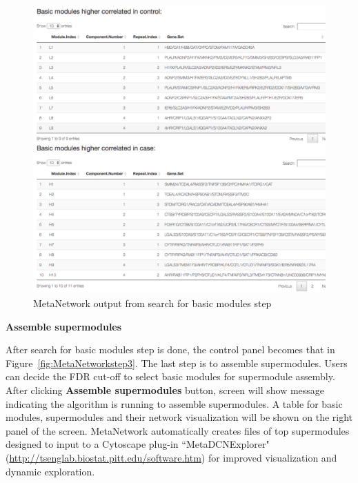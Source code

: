 \begin{steps}
\begin{figure}[H]
\begin{center}
\includegraphics[scale=0.9]{./figure/MetaNetwork/MetaNetworkBM}
\caption{MetaNetwork output from search for basic modules step}
\label{fig:MetaNetworkBM}
\end{center}
\end{figure}

\item \textbf{Assemble supermodules}

After search for basic modules step is done, the control panel becomes that in Figure~\ref{fig:MetaNetworkstep3}. The last step is to assemble supermodules. Users can decide the FDR cut-off to select basic modules for supermodule assembly. 
After clicking \textbf{Assemble supermodules} button, screen will show message indicating the algorithm is running to assemble supermodules.
A table for basic modules, supermodules and their network visualization will be shown on the right panel of the screen.
MetaNetwork automatically creates files of top supermodules designed to input to a Cytoscape plug-in ``MetaDCNExplorer"
(\url{http://tsenglab.biostat.pitt.edu/software.htm}) for improved visualization and dynamic exploration.


\end{steps}
